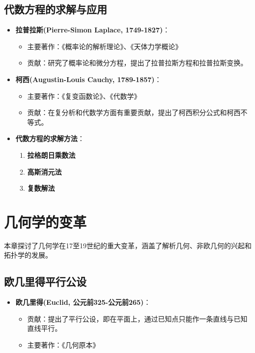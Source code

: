 \documentclass{Math_Note}
\begin{document}
\subsection{代数方程的求解与应用}
\begin{itemize}
    \item \textbf{拉普拉斯(Pierre-Simon Laplace, 1749-1827)}：
    \begin{itemize}
        \item 主要著作：《概率论的解析理论》、《天体力学概论》
        \item 贡献：研究了概率论和微分方程，提出了拉普拉斯方程和拉普拉斯变换。
    \end{itemize}
    
    \item \textbf{柯西(Augustin-Louis Cauchy, 1789-1857)}：
    \begin{itemize}
        \item 主要著作：《复变函数论》、《代数学》
        \item 贡献：在复分析和代数学方面有重要贡献，提出了柯西积分公式和柯西不等式。
    \end{itemize}

    \item \textbf{代数方程的求解方法}：
    \begin{enumerate}
        \item \textbf{拉格朗日乘数法}
        \item \textbf{高斯消元法}
        \item \textbf{复数解法}
    \end{enumerate}
\end{itemize}

\section{几何学的变革}
本章探讨了几何学在17至19世纪的重大变革，涵盖了解析几何、非欧几何的兴起和拓扑学的发展。

\subsection{欧几里得平行公设}
\begin{itemize}
    \item \textbf{欧几里得(Euclid, 公元前325-公元前265)}：
    \begin{itemize}
        \item 贡献：提出了平行公设，即在平面上，通过已知点只能作一条直线与已知直线平行。
        \item 主要著作：《几何原本》
    \end{itemize}
\end{itemize}
\end{document}
